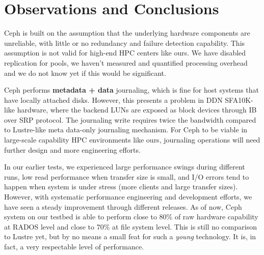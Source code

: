 \section{Observations and Conclusions}
\label{sec:conclusion}

Ceph is built on the assumption that the underlying hardware components
are unreliable, with little or no redundancy and failure detection capability.
This assumption is not valid for high-end HPC centers like ours. We have
disabled replication for pools, we haven't measured and quantified
processing overhead and we do not know yet if this would be significant.

Ceph performs \textbf{metadata + data} journaling, which is fine for host
systems that have locally attached disks. However, this presents a problem in
DDN SFA10K-like hardware, where the backend LUNs are exposed as block devices
through IB over SRP protocol. The journaling write requires twice the
bandwidth compared to Lustre-like meta data-only journaling mechanism. For
Ceph to be viable in large-scale capability HPC environments like ours,
journaling operations will need further design and more engineering efforts.

In our earlier tests, we experienced large performance swings during different
runs, low read performance when transfer size is small, and I/O errors tend to
happen when system is under stress (more clients and large transfer sizes).
However, with systematic performance engineering and development efforts, we
have seen a steady improvement through different releases. As of now, Ceph
system on our testbed is able to perform close to 80\% of raw hardware
capability at RADOS level and close to 70\% at file system level. This is
still no comparison to Lustre yet, but by no means a small feat for such a
\textit{young} technology. It is, in fact, a very respectable level of
performance. 


